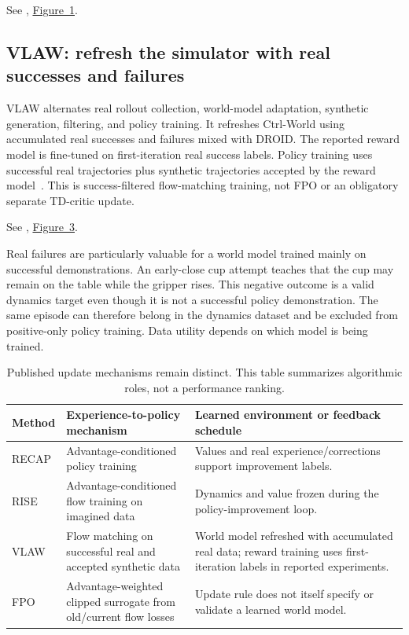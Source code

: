 \FloatBarrier
{}
\noindent See \citet{vlaw}, \href{https://arxiv.org/pdf/2602.12063v2}{Figure~1}.


\subsection{VLAW: refresh the simulator with real successes and failures}
VLAW alternates real rollout collection, world-model adaptation, synthetic generation, filtering, and policy training. It refreshes Ctrl-World using accumulated real successes and failures mixed with DROID. The reported reward model is fine-tuned on first-iteration real success labels. Policy training uses successful real trajectories plus synthetic trajectories accepted by the reward model~\citep{vlaw}. This is success-filtered flow-matching training, not FPO or an obligatory separate TD-critic update.

\noindent See \citet{vlaw}, \href{https://arxiv.org/pdf/2602.12063v2}{Figure~3}.


Real failures are particularly valuable for a world model trained mainly on successful demonstrations. An early-close cup attempt teaches that the cup may remain on the table while the gripper rises. This negative outcome is a valid dynamics target even though it is not a successful policy demonstration. The same episode can therefore belong in the dynamics dataset and be excluded from positive-only policy training. Data utility depends on which model is being trained.

\begin{table}[htbp]\centering\small
\caption{Published update mechanisms remain distinct. This table summarizes algorithmic roles, not a performance ranking.}
\begin{tabularx}{\linewidth}{@{}p{19mm}YY@{}}\toprule
Method & Experience-to-policy mechanism & Learned environment or feedback schedule\\\midrule
RECAP & Advantage-conditioned policy training & Values and real experience/corrections support improvement labels.\\
RISE & Advantage-conditioned flow training on imagined data & Dynamics and value frozen during the policy-improvement loop.\\
VLAW & Flow matching on successful real and accepted synthetic data & World model refreshed with accumulated real data; reward training uses first-iteration labels in reported experiments.\\
FPO & Advantage-weighted clipped surrogate from old/current flow losses & Update rule does not itself specify or validate a learned world model.\\\bottomrule
\end{tabularx}\label{tab:methods}
\end{table}

